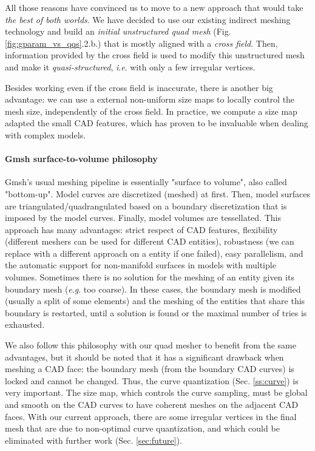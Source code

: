 \documentclass[AMA,STIX1COL]{WileyNJD-v2}
\newcommand{\ie}{\textit{i}.\textit{e}. }
\newcommand{\eg}{\textit{e}.\textit{g}. }
\newcommand\rsec[1]{Sec. \ref{#1}}
\newcommand\rfig[1]{Fig. \ref{#1}}
\begin{document}
{All those reasons have convinced us to move to a new approach that
would take \emph{the best of both worlds}. We have decided to use
our existing indirect meshing technology and build an \emph{initial unstructured quad
    mesh} (\rfig{fig:gparam_vs_qqs}.2.b.) that is mostly aligned with a \emph{cross
field}. Then, information provided by the cross field is used   
to modify this unstructured mesh and make it \emph{quasi-structured},
\ie with only a few irregular vertices.

Besides working even if the cross field is inaccurate, there is another big advantage:
we can use a external non-uniform size maps to locally control the mesh
size, independently of the cross field. In practice, we compute a size map
adapted the small CAD features, which has proven to be invaluable when
dealing with complex models.

\paragraph{Gmsh surface-to-volume philosophy} 

Gmsh's usual meshing pipeline is essentially "surface to volume", also called
"bottom-up". Model curves are discretized (meshed) at first. Then, model
surfaces are triangulated/quadrangulated based on a boundary discretization
that is imposed by the model curves. Finally, model volumes are tessellated.
This approach has many advantages: strict respect of CAD features, flexibility
(different meshers can be used for different CAD entities), robustness (we can 
replace with a different approach on a entity if one failed), easy parallelism, and the
automatic support for non-manifold surfaces in
models with multiple volumes. Sometimes there is no solution for the meshing of
an entity given its boundary mesh (\eg too coarse). In these cases, the
boundary mesh is modified (usually a split of some elements) and the meshing of
the entities that share this boundary is restarted, until a solution is found
or the maximal number of tries is exhausted.

We also follow this philosophy with our quad mesher to benefit from the same
advantages, but it should be noted that it has a significant drawback when
meshing a CAD face: the boundary mesh (from the boundary CAD curves) is locked
and cannot be changed. Thus, the curve quantization (\rsec{ss:curve}) is very
important. The size map, which controls the curve sampling, must be global
and smooth on the CAD curves to have coherent meshes on the adjacent CAD faces.
With our current approach, there are some irregular vertices in the final mesh that
are due to non-optimal curve quantization, and which could be eliminated with 
further work (\rsec{sec:future}).


}
\end{document}

